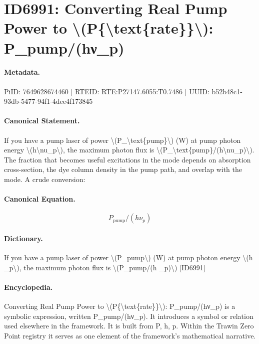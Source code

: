 \section*{ID6991: Converting Real Pump Power to \textbackslash{}(P\{\textbackslash{}text\{rate\}\}\textbackslash{}): P\_pump/(hν\_p)}
\paragraph{Metadata.}
PiID: 7649628674460 | RTEID: RTE:P27147.6055:T0.7486 | UUID: b52b48c1-93db-5477-94f1-4dee4f173845

\paragraph{Canonical Statement.}
If you have a pump laser of power \textbackslash{}(P\_\textbackslash{}text\{pump\}\textbackslash{}) (W) at pump photon energy \textbackslash{}(h\textbackslash{}nu\_p\textbackslash{}), the maximum photon flux is \textbackslash{}(P\_\textbackslash{}text\{pump\}/(h\textbackslash{}nu\_p)\textbackslash{}). The fraction that becomes useful excitations in the mode depends on absorption cross-section, the dye column density in the pump path, and overlap with the mode. A crude conversion:

\paragraph{Canonical Equation.}
\[
P_\text{pump}/(h\nu_p)
\]

\paragraph{Dictionary.}
If you have a pump laser of power \textbackslash{}(P\_pump\textbackslash{}) (W) at pump photon energy \textbackslash{}(h \_p\textbackslash{}), the maximum photon flux is \textbackslash{}(P\_pump/(h \_p)\textbackslash{}) [ID6991]

\paragraph{Encyclopedia.}
Converting Real Pump Power to \textbackslash{}(P\{\textbackslash{}text\{rate\}\}\textbackslash{}): P\_pump/(hν\_p) is a symbolic expression, written P\_pump/(hν\_p). It introduces a symbol or relation used elsewhere in the framework. It is built from P, h, p. Within the Trawin Zero Point registry it serves as one element of the framework's mathematical narrative.
